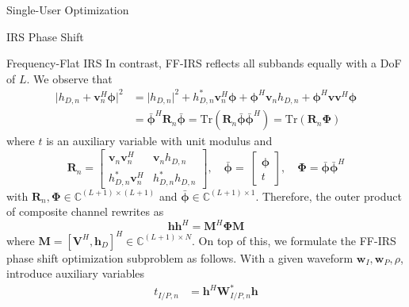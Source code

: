 \documentclass{IEEEtran}
\begin{document}
\begin{section}{Single-User Optimization}
\begin{subsection}{IRS Phase Shift}
		\begin{subsubsection}{Frequency-Flat IRS}
			In contrast, FF-IRS reflects all subbands equally with a DoF of $L$. We observe that
			\begin{equation}
				\begin{split}
					\lvert{h_{D,n}+\boldsymbol{v}_n^H\boldsymbol{\phi}}\rvert^2
					&=\lvert{h_{D,n}}\rvert^2+h_{D,n}^*\boldsymbol{v}_n^H\boldsymbol{\phi}+\boldsymbol{\phi}^H\boldsymbol{v}_n{h_{D,n}}+\boldsymbol{\phi}^H\boldsymbol{v}\boldsymbol{v}^H\boldsymbol{\phi}\\
					&=\bar{\boldsymbol{\phi}}^H\boldsymbol{R}_n\bar{\boldsymbol{\phi}}=\mathrm{Tr}(\boldsymbol{R}_n\bar{\boldsymbol{\phi}}\bar{\boldsymbol{\phi}}^H)=\mathrm{Tr}(\boldsymbol{R}_n\boldsymbol{\Phi})
				\end{split}
			\end{equation}
			where $t$ is an auxiliary variable with unit modulus and
			\begin{equation}\label{eq:R_n,phi}
				\boldsymbol{R}_n=
				\begin{bmatrix}
					\boldsymbol{v}_n\boldsymbol{v}_n^H & \boldsymbol{v}_n{h_{D,n}} \\
					h_{D,n}^*{\boldsymbol{v}_n^H}      & h_{D,n}^*{h_{D,n}}
				\end{bmatrix},
				\quad \bar{\boldsymbol{\phi}}=\
				\begin{bmatrix}
					\boldsymbol{\phi} \\
					t
				\end{bmatrix},
				\quad \boldsymbol{\Phi}=\bar{\boldsymbol{\phi}}\bar{\boldsymbol{\phi}}^H
			\end{equation}
			with $\boldsymbol{R}_n,\boldsymbol{\Phi} \in \mathbb{C}^{(L+1) \times (L+1)}$ and $\bar{\boldsymbol{\phi}} \in \mathbb{C}^{(L+1) \times 1}$. Therefore, the outer product of composite channel rewrites as
			\begin{equation}\label{eq:M}
				\boldsymbol{h}\boldsymbol{h}^H=\boldsymbol{M}^H\boldsymbol{\Phi}\boldsymbol{M}
			\end{equation}
			where $\boldsymbol{M}=[\boldsymbol{V}^H,\boldsymbol{h}_D]^H \in \mathbb{C}^{(L+1) \times N}$. On top of this, we formulate the FF-IRS phase shift optimization subproblem as follows. With a given waveform $\boldsymbol{w}_I,\boldsymbol{w}_P,\rho$, introduce auxiliary variables
			\begin{equation}\label{eq:t}
				\begin{split}
					t_{I/P,n}
					&=\boldsymbol{h}^H\boldsymbol{W}_{I/P,n}^*\boldsymbol{h}\\

\end{split}
\end{equation}
\end{subsubsection}
\end{subsection}
\end{section}
\end{document}
